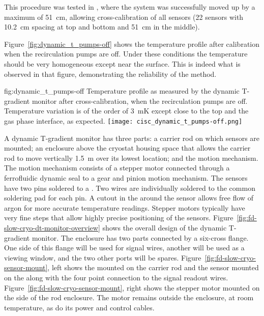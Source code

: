 This procedure was tested in , where the system was successfully moved up by a maximum of \SI{51}{cm}, allowing cross-calibration of all sensors (22 sensors with \SI{10.2}{cm} spacing at top and bottom and \SI{51}{cm} in the middle). 

Figure~\ref{fig:dynamic_t_pumps-off} shows the temperature profile after calibration when the recirculation pumps are off. Under these conditions the  temperature should be very homogeneous except near the surface. This is indeed what is observed in that figure, demonstrating the reliability of the method.  

\begin{dunefigure}{fig:dynamic_t_pumps-off}
  {Temperature profile as measured by the dynamic T-gradient monitor after cross-calibration, when the recirculation pumps are off. Temperature variation is of the order of \SI{3}{mK} except close to the top and the gas phase interface, as expected.}
  \texttt{[image: cisc\_dynamic\_t\_pumps-off.png]}%
\end{dunefigure}


A dynamic T-gradient monitor has three parts: a carrier rod on which sensors are mounted; an enclosure above the cryostat housing space that allows the carrier rod to move vertically  \SI{1.5}{m} over its lowest location; and the motion mechanism. The motion mechanism consists of a stepper motor connected through a ferrofluidic dynamic seal to a gear and pinion motion mechanism. The sensors have two pins soldered to a . 
Two wires are individually soldered to the common soldering pad for each pin.  A cutout in the  around the sensor allows free flow of argon for more accurate temperature readings.  Stepper motors typically have very fine steps that allow highly precise positioning of the sensors.  Figure~\ref{fig:fd-slow-cryo-dt-monitor-overview} shows the overall design of the dynamic T-gradient monitor. %
The enclosure has two parts connected by a six-cross flange. One side of this flange will be used for signal wires, another will be used as a viewing window, and the two other ports will be spares. Figure~\ref{fig:fd-slow-cryo-sensor-mount}, left shows the  mounted on the carrier rod and the sensor mounted on the  along with the four point connection to the signal readout wires. %
Figure~\ref{fig:fd-slow-cryo-sensor-mount}, right shows the stepper motor mounted on the side of the rod enclosure. The motor remains outside the enclosure, at room temperature, %
as do its power and control cables. %

